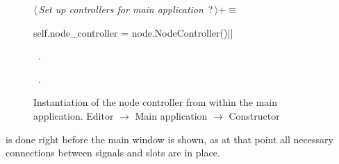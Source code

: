 \documentclass[%
    a4paper,    %
    justified,  %
    nobib,      %
    openany     %
]{tufte-book}
\makeatletter
\renewcommand{\label}[1]{\@tufte@label{##1}}%
\makeatother
\begin{document}
\begin{figure}
\begin{flushleft} \small
\begin{minipage}{\linewidth}\label{scrap146}\raggedright\small
{} $\langle\,${\itshape Set up controllers for main application}\nobreak\ {\footnotesize {?}}$\,\rangle+\equiv$
\vspace{-1ex}
\begin{pythoncode}
self.node_controller = node.NodeController()|\NWsep|
\end{pythoncode}
\vspace{1.5ex}
\footnotesize
\begin{list}{}{\setlength{\itemsep}{-\parsep}\setlength{\itemindent}{-\leftmargin}}
\item \NWtxtMacroDefBy\ .
\item \NWtxtMacroRefIn\ .

\item{}
\end{list}
\end{minipage}\vspace{4ex}
\end{flushleft}
\caption{Instantiation of the node controller from within the main application.
  \newline{}\newline{}Editor $\rightarrow$ Main application $\rightarrow$
  Constructor}
\label{editor:lst:main-application:constructor:setup-node-controller}
\end{figure}

 is done right before the main window is
shown, as at that point all necessary connections between signals and slots are
in place.
\end{document}
